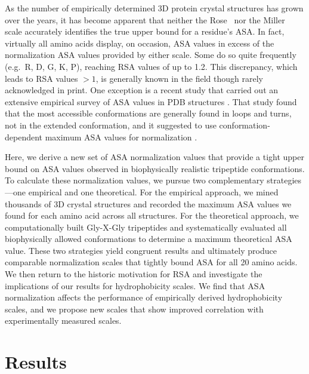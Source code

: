 \documentclass[11pt]{article}
\begin{document}
As the number of empirically determined 3D protein crystal structures has grown over the years, it has become apparent that neither the Rose~\cite{Rose1985} nor the Miller~\cite{Miller1987} scale accurately identifies the true upper bound for a residue's ASA. In fact, virtually all amino acids display, on occasion, ASA values in excess of the normalization ASA values provided by either scale. Some do so quite frequently (e.g.\ R, D, G, K, P), reaching RSA values of up to 1.2. This discrepancy, which leads to RSA values $>1$, is generally known in the field though rarely acknowledged in print. One exception is a recent study that carried out an extensive empirical survey of ASA values in PDB structures  \cite{SinghAhmad2009}. That study found that the most accessible conformations are generally found in loops and turns, not in the extended conformation, and it suggested to use conformation-dependent maximum ASA values for normalization \cite{SinghAhmad2009}.

Here, we derive a new set of ASA normalization values that provide a tight upper bound on ASA values observed in biophysically realistic tripeptide conformations. To calculate these normalization values, we pursue two complementary strategies---one empirical and one theoretical. For the empirical approach, we mined thousands of 3D crystal structures and recorded the maximum ASA values we found for each amino acid across all structures. For the theoretical approach, we computationally built Gly-X-Gly tripeptides and systematically evaluated all biophysically allowed conformations to determine a maximum theoretical ASA value. These two strategies yield congruent results and ultimately produce comparable normalization scales that tightly bound ASA for all 20 amino acids. We then return to the historic motivation for RSA and investigate the implications of our results for hydrophobicity scales. We find that ASA normalization affects the performance of empirically derived hydrophobicity scales, and we propose new scales that show improved correlation with experimentally measured scales.


\section*{Results}
\end{document}
